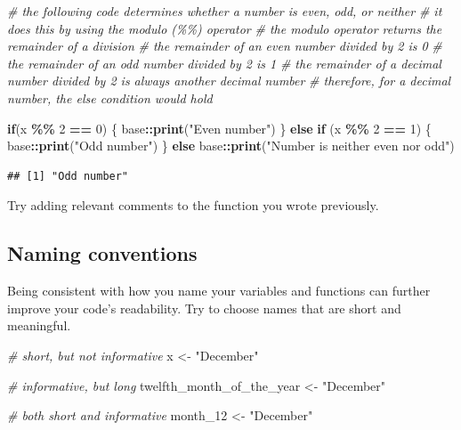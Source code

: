 \documentclass[
]{book}
\newenvironment{Shaded}{\begin{snugshade}}{\end{snugshade}}
\newcommand{\CommentTok}[1]{\textcolor[rgb]{0.56,0.35,0.01}{\textit{#1}}}
\newcommand{\ControlFlowTok}[1]{\textcolor[rgb]{0.13,0.29,0.53}{\textbf{#1}}}
\newcommand{\DecValTok}[1]{\textcolor[rgb]{0.00,0.00,0.81}{#1}}
\newcommand{\FunctionTok}[1]{\textcolor[rgb]{0.13,0.29,0.53}{\textbf{#1}}}
\newcommand{\NormalTok}[1]{#1}
\newcommand{\OtherTok}[1]{\textcolor[rgb]{0.56,0.35,0.01}{#1}}
\newcommand{\SpecialCharTok}[1]{\textcolor[rgb]{0.81,0.36,0.00}{\textbf{#1}}}
\newcommand{\StringTok}[1]{\textcolor[rgb]{0.31,0.60,0.02}{#1}}
\begin{document}
\begin{Shaded}
\begin{Highlighting}[]
\CommentTok{\# the following code determines whether a number is even, odd, or neither}
\CommentTok{\# it does this by using the modulo (\%\%) operator}
\CommentTok{\# the modulo operator returns the remainder of a division}
\CommentTok{\# the remainder of an even number divided by 2 is 0}
\CommentTok{\# the remainder of an odd number divided by 2 is 1}
\CommentTok{\# the remainder of a decimal number divided by 2 is always another decimal number}
\CommentTok{\# therefore, for a decimal number, the else condition would hold}

\ControlFlowTok{if}\NormalTok{(x }\SpecialCharTok{\%\%} \DecValTok{2} \SpecialCharTok{==} \DecValTok{0}\NormalTok{) \{}
\NormalTok{  base}\SpecialCharTok{::}\FunctionTok{print}\NormalTok{(}\StringTok{"Even number"}\NormalTok{)}
\NormalTok{\} }\ControlFlowTok{else} \ControlFlowTok{if}\NormalTok{ (x }\SpecialCharTok{\%\%} \DecValTok{2} \SpecialCharTok{==} \DecValTok{1}\NormalTok{) \{}
\NormalTok{  base}\SpecialCharTok{::}\FunctionTok{print}\NormalTok{(}\StringTok{"Odd number"}\NormalTok{)}
\NormalTok{\} }\ControlFlowTok{else}
\NormalTok{  base}\SpecialCharTok{::}\FunctionTok{print}\NormalTok{(}\StringTok{"Number is neither even nor odd"}\NormalTok{)}
\end{Highlighting}
\end{Shaded}

\begin{verbatim}
## [1] "Odd number"
\end{verbatim}

Try adding relevant comments to the function you wrote previously.

\subsection{Naming conventions}\label{sec:NamingConventions}

Being consistent with how you name your variables and functions can further improve your code's readability. Try to choose names that are short and meaningful.

\begin{Shaded}
\begin{Highlighting}[]
\CommentTok{\# short, but not informative}
\NormalTok{x }\OtherTok{\textless{}{-}} \StringTok{"December"}

\CommentTok{\# informative, but long}
\NormalTok{twelfth\_month\_of\_the\_year }\OtherTok{\textless{}{-}} \StringTok{"December"}

\CommentTok{\# both short and informative}
\NormalTok{month\_12 }\OtherTok{\textless{}{-}} \StringTok{"December"}
\end{Highlighting}
\end{Shaded}
\end{document}
